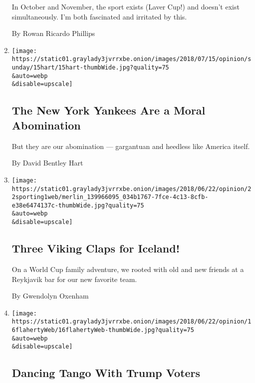 \begin{enumerate}
  In October and November, the sport exists (Laver Cup!) and doesn't
  exist simultaneously. I'm both fascinated and irritated by this.

  By Rowan Ricardo Phillips
\item
  \href{/2018/07/14/opinion/new-york-yankees-evil.html}{}

  \texttt{[image: https://static01.graylady3jvrrxbe.onion/images/2018/07/15/opinion/sunday/15hart/15hart-thumbWide.jpg?quality=75\\\&auto=webp\\\&disable=upscale]}

  \hypertarget{the-new-york-yankees-are-a-moral-abomination}{%
  \subsection{The New York Yankees Are a Moral
  Abomination}\label{the-new-york-yankees-are-a-moral-abomination}}

  But they are our abomination --- gargantuan and heedless like America
  itself.

  By David Bentley Hart
\item
  \href{/2018/06/22/opinion/world-cup-iceland-football.html}{}

  \texttt{[image: https://static01.graylady3jvrrxbe.onion/images/2018/06/22/opinion/22sporting1web/merlin\_139966095\_034b1767-7fce-4c13-8cfb-e38e6474137c-thumbWide.jpg?quality=75\\\&auto=webp\\\&disable=upscale]}

  \hypertarget{three-viking-claps-for-iceland}{%
  \subsection{Three Viking Claps for
  Iceland!}\label{three-viking-claps-for-iceland}}

  On a World Cup family adventure, we rooted with old and new friends at
  a Reykjavik bar for our new favorite team.

  By Gwendolyn Oxenham
\item
  \href{/2018/06/17/opinion/dancing-tango-with-trump-voters.html}{}

  \texttt{[image: https://static01.graylady3jvrrxbe.onion/images/2018/06/22/opinion/16flahertyWeb/16flahertyWeb-thumbWide.jpg?quality=75\\\&auto=webp\\\&disable=upscale]}

  \hypertarget{dancing-tango-with-trump-voters}{%
  \subsection{Dancing Tango With Trump
  Voters}\label{dancing-tango-with-trump-voters}}


\end{enumerate}
